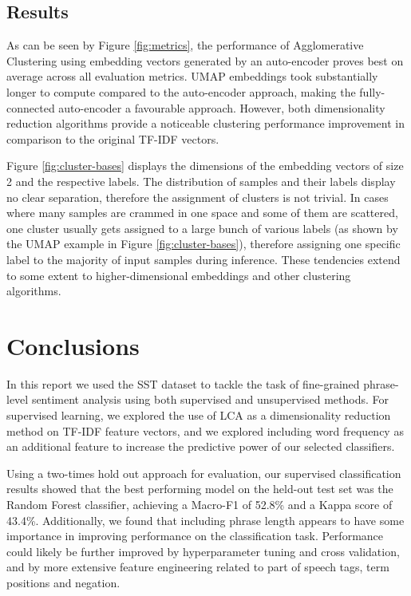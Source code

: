 \documentclass{article}
\begin{document}
\subsection{Results}

As can be seen by Figure \ref{fig:metrics}, the performance of Agglomerative Clustering using embedding vectors generated by an auto-encoder proves best on average across all evaluation metrics. UMAP embeddings took substantially longer to compute compared to the auto-encoder approach, making the fully-connected auto-encoder a favourable approach. However, both dimensionality reduction algorithms provide a noticeable clustering performance improvement in comparison to the original TF-IDF vectors. 

Figure \ref{fig:cluster-bases} displays the dimensions of the embedding vectors of size 2 and the respective labels. The distribution of samples and their labels display no clear separation, therefore the assignment of clusters is not trivial. In cases where many samples are crammed in one space and some of them are scattered, one cluster usually gets assigned to a large bunch of various labels (as shown by the UMAP example in Figure \ref{fig:cluster-bases}), therefore assigning one specific label to the majority of input samples during inference. These tendencies extend to some extent to higher-dimensional embeddings and other clustering algorithms.

\section{Conclusions}

In this report we used the SST dataset to tackle the task of fine-grained phrase-level sentiment analysis using both supervised and unsupervised methods. For supervised learning, we explored the use of LCA as a dimensionality reduction method on TF-IDF feature vectors, and we explored including word frequency as an additional feature to increase the predictive power of our selected classifiers.  

Using a two-times hold out approach for evaluation, our supervised classification results showed that the best performing model on the held-out test set was the Random Forest classifier, achieving a Macro-F1 of 52.8\% and a Kappa score of 43.4\%. Additionally, we found that including phrase length appears to have some importance in improving performance on the classification task. Performance could likely be further improved by hyperparameter tuning and cross validation, and by more extensive feature engineering related to part of speech tags, term positions and negation. 
\end{document}
